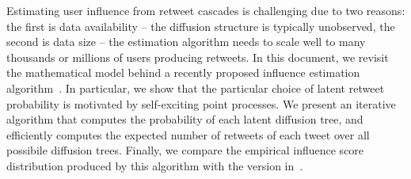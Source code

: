 %
Estimating user influence from retweet cascades is challenging
due to two reasons:
the first is data availability -- the diffusion structure is typically unobserved,
the second is data size -- the estimation algorithm needs to scale well to
many thousands or millions of users producing retweets.
In this document, we revisit the mathematical model behind a recently proposed
influence estimation algorithm~\citep{Rizoiu2018a}.
In particular, we show that the particular choice of latent retweet probability
is motivated by self-exciting point processes.
We present an iterative algorithm that computes the probability of each
latent diffusion tree, and efficiently computes the expected number of retweets
of each tweet over all possibile diffusion trees.
Finally, we compare the empirical influence score distribution produced by this algorithm with the version in~\citep{Rizoiu2018a}.
